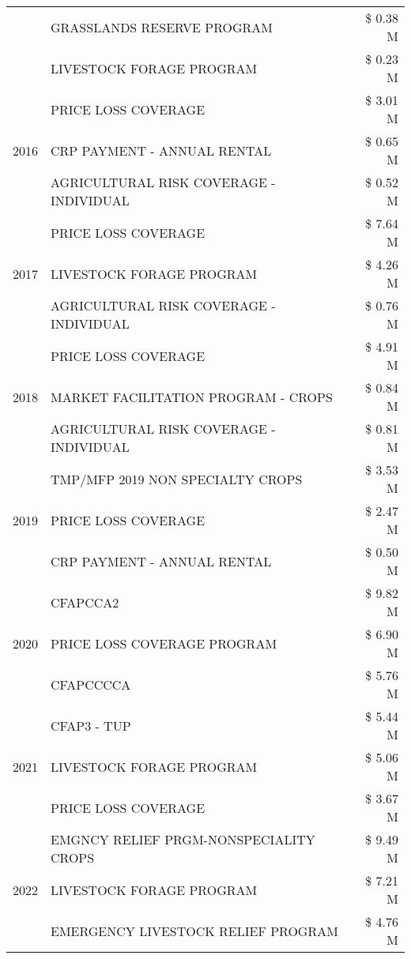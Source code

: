 \begin{tabular}{llr}
 & GRASSLANDS RESERVE PROGRAM & \$ 0.38 M \\
 & LIVESTOCK FORAGE PROGRAM & \$ 0.23 M \\
\cline{1-3}
\multirow[t]{3}{*}{2016} & PRICE LOSS COVERAGE & \$ 3.01 M \\
 & CRP PAYMENT - ANNUAL RENTAL & \$ 0.65 M \\
 & AGRICULTURAL RISK COVERAGE - INDIVIDUAL & \$ 0.52 M \\
\cline{1-3}
\multirow[t]{3}{*}{2017} & PRICE LOSS COVERAGE & \$ 7.64 M \\
 & LIVESTOCK FORAGE PROGRAM & \$ 4.26 M \\
 & AGRICULTURAL RISK COVERAGE - INDIVIDUAL & \$ 0.76 M \\
\cline{1-3}
\multirow[t]{3}{*}{2018} & PRICE LOSS COVERAGE & \$ 4.91 M \\
 & MARKET FACILITATION PROGRAM - CROPS & \$ 0.84 M \\
 & AGRICULTURAL RISK COVERAGE - INDIVIDUAL & \$ 0.81 M \\
\cline{1-3}
\multirow[t]{3}{*}{2019} & TMP/MFP 2019 NON SPECIALTY CROPS & \$ 3.53 M \\
 & PRICE LOSS COVERAGE & \$ 2.47 M \\
 & CRP PAYMENT - ANNUAL RENTAL & \$ 0.50 M \\
\cline{1-3}
\multirow[t]{3}{*}{2020} & CFAPCCA2 & \$ 9.82 M \\
 & PRICE LOSS COVERAGE PROGRAM & \$ 6.90 M \\
 & CFAPCCCCA & \$ 5.76 M \\
\cline{1-3}
\multirow[t]{3}{*}{2021} & CFAP3 - TUP & \$ 5.44 M \\
 & LIVESTOCK FORAGE PROGRAM & \$ 5.06 M \\
 & PRICE LOSS COVERAGE & \$ 3.67 M \\
\cline{1-3}
\multirow[t]{3}{*}{2022} & EMGNCY RELIEF PRGM-NONSPECIALITY CROPS & \$ 9.49 M \\
 & LIVESTOCK FORAGE PROGRAM & \$ 7.21 M \\
 & EMERGENCY LIVESTOCK RELIEF PROGRAM & \$ 4.76 M \\
\cline{1-3}
\bottomrule
\end{tabular}
